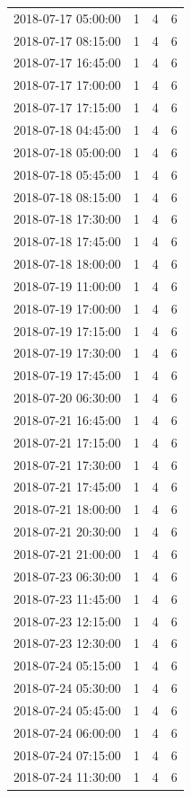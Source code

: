\begin{tabular}{lrrr}
2018-07-17 05:00:00 & 1 & 4 & 6 \\
2018-07-17 08:15:00 & 1 & 4 & 6 \\
2018-07-17 16:45:00 & 1 & 4 & 6 \\
2018-07-17 17:00:00 & 1 & 4 & 6 \\
2018-07-17 17:15:00 & 1 & 4 & 6 \\
2018-07-18 04:45:00 & 1 & 4 & 6 \\
2018-07-18 05:00:00 & 1 & 4 & 6 \\
2018-07-18 05:45:00 & 1 & 4 & 6 \\
2018-07-18 08:15:00 & 1 & 4 & 6 \\
2018-07-18 17:30:00 & 1 & 4 & 6 \\
2018-07-18 17:45:00 & 1 & 4 & 6 \\
2018-07-18 18:00:00 & 1 & 4 & 6 \\
2018-07-19 11:00:00 & 1 & 4 & 6 \\
2018-07-19 17:00:00 & 1 & 4 & 6 \\
2018-07-19 17:15:00 & 1 & 4 & 6 \\
2018-07-19 17:30:00 & 1 & 4 & 6 \\
2018-07-19 17:45:00 & 1 & 4 & 6 \\
2018-07-20 06:30:00 & 1 & 4 & 6 \\
2018-07-21 16:45:00 & 1 & 4 & 6 \\
2018-07-21 17:15:00 & 1 & 4 & 6 \\
2018-07-21 17:30:00 & 1 & 4 & 6 \\
2018-07-21 17:45:00 & 1 & 4 & 6 \\
2018-07-21 18:00:00 & 1 & 4 & 6 \\
2018-07-21 20:30:00 & 1 & 4 & 6 \\
2018-07-21 21:00:00 & 1 & 4 & 6 \\
2018-07-23 06:30:00 & 1 & 4 & 6 \\
2018-07-23 11:45:00 & 1 & 4 & 6 \\
2018-07-23 12:15:00 & 1 & 4 & 6 \\
2018-07-23 12:30:00 & 1 & 4 & 6 \\
2018-07-24 05:15:00 & 1 & 4 & 6 \\
2018-07-24 05:30:00 & 1 & 4 & 6 \\
2018-07-24 05:45:00 & 1 & 4 & 6 \\
2018-07-24 06:00:00 & 1 & 4 & 6 \\
2018-07-24 07:15:00 & 1 & 4 & 6 \\
2018-07-24 11:30:00 & 1 & 4 & 6 \\

\end{tabular}
